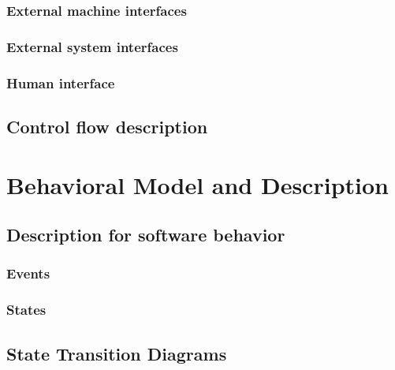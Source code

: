 \documentclass{article}
\begin{document}
\subsubsection{External machine interfaces}

\subsubsection{External system interfaces}

\subsubsection{Human interface}

\subsection{Control flow description}

\section{ Behavioral Model and Description}

\subsection{Description for software behavior}

\subsubsection{Events}

\subsubsection{States}

\subsection{State Transition Diagrams}
\end{document}

